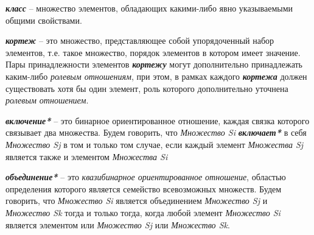 \textbf{\textit{класс}} – множество элементов, обладающих какими-либо явно указываемыми общими свойствами.

\begin{SCn}
\end{SCn}

\textbf{\textit{кортеж}} – это множество, представляющее собой упорядоченный набор элементов, т.е. такое множество, порядок элементов в котором имеет значение. Пары принадлежности элементов \textbf{\textit{кортежу}} могут дополнительно принадлежать каким-либо \textit{ролевым отношениям}, при этом, в рамках каждого \textbf{\textit{кортежа}} должен существовать хотя бы один элемент, роль которого дополнительно уточнена \textit{ролевым отношением}.


\begin{SCn}
\end{SCn}

\textbf{\textit{включение*}} – это бинарное ориентированное отношение, каждая связка которого связывает два множества. Будем говорить, что \textit{Множество Si} \textbf{\textit{включает*}} в себя \textit{Множество Sj} в том и только том случае, если каждый элемент \textit{Множества Sj} является также и элементом \textit{Множества Si}

\begin{SCn}
\end{SCn}
	
\textbf{\textit{объединение*}} – это \textit{квазибинарное ориентированное отношение}, областью определения которого является семейство всевозможных множеств. Будем говорить, что \textit{Множество Si} является объединением \textit{Множество Sj} и \textit{Множество Sk} тогда и только тогда, когда любой элемент \textit{Множество Si} является элементом или \textit{Множество Sj} или \textit{Множество Sk}.

